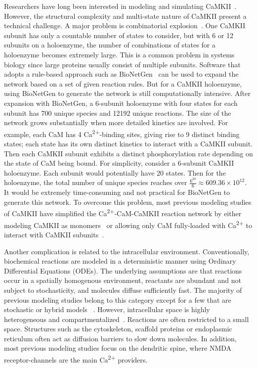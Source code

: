 \documentclass[10pt,letterpaper]{article}
\begin{document}
Researchers have long been interested in modeling and simulating CaMKII~\cite{Zhabotinsky:2000fp,Holmes:2000uk,Kubota:2001ul,Dupont:2003vq,Bhalla:2004cu,Lucic:2008gt,Zeng:2010bq,Pepke:2010ju,Michalski:2012ds}. However, the structural complexity and multi-state nature of CaMKII present a technical challenge. A major problem is combinatorial explosion~\cite{Stefan:2014gl}. One CaMKII subunit has only a countable number of states to consider, but with 6 or 12 subunits on a holoenzyme, the number of combinations of states for a holoenzyme becomes extremely large. This is a common problem in systems biology since large proteins usually consist of multiple subunits. Software that adopts a rule-based approach such as BioNetGen~\cite{Hlavacek:2006iq} can be used to expand the network based on a set of given reaction rules. But for a CaMKII holoenzyme, using BioNetGen to generate the network is still computationally intensive. After expansion with BioNetGen, a 6-subunit holoenzyme with four states for each subunit has 700 unique species and 12192 unique reactions. The size of the network grows substantially when more detailed kinetics are involved. For example, each CaM has 4 Ca\textsuperscript{2+}-binding sites, giving rise to 9 distinct binding states; each state has its own distinct kinetics to interact with a CaMKII subunit. Then each CaMKII subunit exhibits a distinct phosphorylation rate depending on the state of CaM being bound. For simplicity, consider a 6-subunit CaMKII holoenzyme. Each subunit would potentially have 20 states. Then for the holoenzyme, the total number of unique species reaches over $\frac{6^{20}}{6} \approx 609.36\times10^{12}$. It would be extremely time-consuming and not practical for BioNetGen to generate this network. To overcome this problem, most previous modeling studies of CaMKII have simplified the Ca\textsuperscript{2+}-CaM-CaMKII reaction network by either modeling CaMKII as monomers~\cite{Bhalla:2004cu,Pepke:2010ju} or allowing only CaM fully-loaded with Ca\textsuperscript{2+} to interact with CaMKII subunits~\cite{Zhabotinsky:2000fp,Kubota:2001ul,Dupont:2003vq,Michalski:2012ds}.

Another complication is related to the intracellular environment. Conventionally, biochemical reactions are modeled in a deterministic manner using Ordinary Differential Equations (ODEs). The underlying assumptions are that reactions occur in a spatially homogenous environment, reactants are abundant and not subject to stochasticity, and molecules diffuse sufficiently fast. The majority of previous modeling studies belong to this category except for a few that are stochastic or hybrid models ~\cite{Bhalla:2004cu, Zeng:2010bq, Holmes:2000uk}. However, intracellular space is highly heterogeneous and compartmentalized~\cite{LubyPhelps:2000uj,Dix:2008gy}. Reactions are often restricted to a small space. Structures such as the cytoskeleton, scaffold proteins or endoplasmic reticulum often act as diffusion barriers to slow down molecules. In addition, most previous modeling studies focus on the dendritic spine, where NMDA receptor-channels are the main Ca\textsuperscript{2+} providers. 
\end{document}
